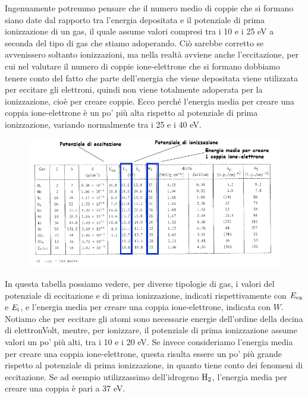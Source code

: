 Ingenuamente potremmo pensare che il numero medio di coppie che si formano siano date dal rapporto tra l'energia depositata e il potenziale di prima ionizzazione di un gas, il quale assume valori compresi tra i 10 e i 25 eV a seconda del tipo di gas che stiamo adoperando. Ciò sarebbe corretto se avvenissero soltanto ionizzazioni, ma nella realtà avviene anche l'eccitazione, per cui nel valutare il numero di coppie ione-elettrone che si formano dobbiamo tenere conto del fatto che parte dell'energia che viene depositata viene utilizzata per eccitare gli elettroni, quindi non viene totalmente adoperata per la ionizzazione, cioè per creare coppie. Ecco perché l'energia media per creare una coppia ione-elettrone è un po' più alta rispetto al potenziale di prima ionizzazione, variando normalmente tra i 25 e i 40 eV.

\begin{figure}[H]
   \centering
   \includegraphics[width=\textwidth]{immagini/potenziali_ionizzazione.png}
\end{figure}

In questa tabella possiamo vedere, per diverse tipologie di gas, i valori del potenziale di eccitazione e di prima ionizzazione, indicati rispettivamente con $E_{\rm ex}$ e $E_{\rm i}$, e l'energia media per creare una coppia ione-elettrone, indicata con $W$. Notiamo che per eccitare gli atomi sono necessarie energie dell'ordine della decina di elettronVolt, mentre, per ionizzare, il potenziale di prima ionizzazione assume valori un po' più alti, tra i 10 e i 20 eV. Se invece consideriamo l'energia media per creare una coppia ione-elettrone, questa risulta essere un po' più grande rispetto al potenziale di prima ionizzazione, in quanto tiene conto dei fenomeni di eccitazione. Se ad esempio utilizzassimo dell'idrogeno $\rm H_2$, l'energia media per creare una coppia è pari a 37 eV.

\vspace{0.4cm}

